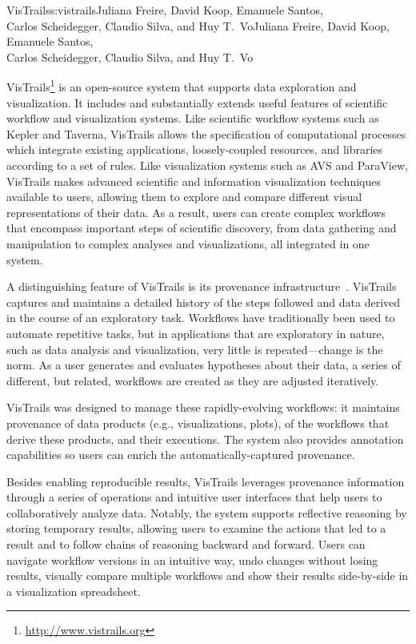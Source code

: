 \begin{aosachaptertoc}{VisTrails}{s:vistrails}{Juliana Freire, David Koop, Emanuele Santos, \\ Carlos Scheidegger, Claudio Silva, and Huy T.\ Vo}{Juliana Freire, David Koop, Emanuele Santos, \\ \hspace*{0.9cm} Carlos Scheidegger, Claudio Silva, and Huy T.\ Vo}

VisTrails\footnote{\url{http://www.vistrails.org}} is an open-source
system that supports data exploration and visualization.  It includes
and substantially extends useful features of scientific workflow and
visualization systems.  Like scientific workflow systems such as
Kepler and Taverna, VisTrails allows the specification of
computational processes which integrate existing applications,
loosely-coupled resources, and libraries according to a set of
rules. Like visualization systems such as AVS and ParaView, VisTrails makes
advanced scientific and information visualization techniques available
to users, allowing them to explore and compare different visual
representations of their data.  As a result, users can create complex
workflows that encompass important steps of scientific discovery, from
data gathering and manipulation to complex analyses and
visualizations, all integrated in one system.

A distinguishing feature of VisTrails is its provenance
infrastructure~\cite{bib:freire:vistrails}.  VisTrails captures and maintains a detailed history 
of the steps followed and data derived in the course of an exploratory
task.  Workflows have traditionally been used to automate repetitive
tasks, but in applications that are exploratory in nature, such as
data analysis and visualization, very little is repeated---change is
the norm. As a user generates and evaluates hypotheses about their
data, a series of different, but related, workflows are created as
they are adjusted iteratively.

VisTrails was designed to manage these rapidly-evolving workflows: it
maintains provenance of data products (e.g., visualizations, plots),
of the workflows that derive these products, and their executions.
The system also provides annotation capabilities so users can enrich
the automatically-captured provenance.

Besides enabling reproducible results, VisTrails leverages provenance
information through a series of operations and intuitive user
interfaces that help users to collaboratively analyze data.  Notably,
the system supports reflective reasoning by storing temporary results,
allowing users to examine the actions that led to a result and to
follow chains of reasoning backward and forward.  Users can navigate
workflow versions in an intuitive way, undo changes without losing
results, visually compare multiple workflows and show their results
side-by-side in a visualization spreadsheet.


\end{aosachaptertoc}
